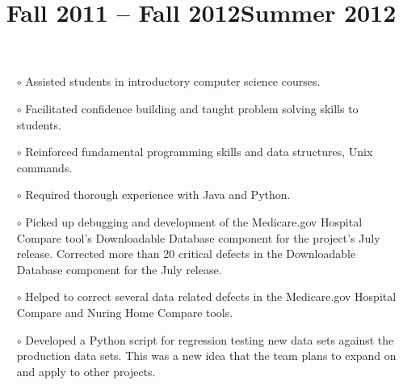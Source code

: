 \begin{resume}
\title{Fall 2011 -- Fall 2012}
\begin{position}
\vspace{-10pt}
\begin{itemize}\setlength{\itemsep}{-0.5mm}
\item[$\circ$] Assisted students in introductory computer science courses. 
\item[$\circ$] Facilitated confidence building and taught problem solving skills to students. 
\item[$\circ$] Reinforced fundamental programming skills and data structures, Unix commands.
\item[$\circ$] Required thorough experience with Java and Python.
\end{itemize}
\end{position}

\title{Summer 2012}
\begin{position}
\vspace{-10pt}
\begin{itemize}\setlength{\itemsep}{-0.5mm}
\item[$\circ$] Picked up debugging and development of the Medicare.gov Hospital Compare tool's Downloadable Database component for the project's July release. Corrected more than 20 critical defects in the Downloadable Database component for the July release.
\item[$\circ$] Helped to correct several data related defects in the Medicare.gov Hospital Compare and Nuring Home Compare tools.
\item[$\circ$] Developed a Python script for regression testing new data sets against the production data sets. This was a new idea that the team plans to expand on and apply to other projects.
\end{itemize}
\end{position}


\end{resume}
